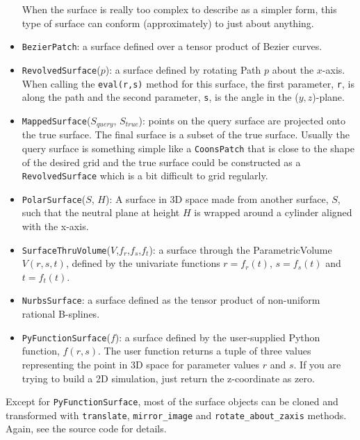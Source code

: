 \documentclass[12pt,a4paper,twoside]{article}
\begin{document}
\begin{itemize}
  When the surface is really too complex to describe as a simpler form,
  this type of surface can conform (approximately) to just about anything.
\item \texttt{BezierPatch}: a surface defined over a tensor product of Bezier curves. 
\item \texttt{RevolvedSurface}($p$): a surface defined by rotating Path $p$
  about the $x$-axis.
  When calling the \texttt{eval(r,s)} method for this surface, 
  the first parameter, \texttt{r}, is along the path and the second parameter, 
  \texttt{s}, is the angle in the ($y,z$)-plane.
\item \texttt{MappedSurface}($S_{query}$, $S_{true}$): points on the
  query surface are projected onto the true surface.
  The final surface is a subset of the true surface.
  Usually the query surface is something simple like a \texttt{CoonsPatch}
  that is close to the shape of the desired grid and
  the true surface could be constructed as a \texttt{RevolvedSurface} which is
  a bit difficult to grid regularly.
\item \texttt{PolarSurface}($S$, $H$): A surface in 3D space made from another surface, $S$,
  such that the neutral plane at height $H$ is wrapped around a cylinder aligned with
  the x-axis.
\item \texttt{SurfaceThruVolume}($V$,$f_r$,$f_s$,$f_t$): a surface through the
  ParametricVolume $V(r,s,t)$, defined by the univariate functions 
  $r=f_r(t)$, $s=f_s(t)$ and $t=f_t(t)$.
\item \texttt{NurbsSurface}: a surface defined as the tensor product of non-uniform rational B-splines.
\item \texttt{PyFunctionSurface}($f$): a surface defined by the user-supplied Python function, $f(r,s)$.
  The user function returns a tuple of three values representing the point in 3D space 
  for parameter values $r$ and $s$.
  If you are trying to build a 2D simulation, just return the z-coordinate as zero.
\end{itemize} 

Except for \texttt{PyFunctionSurface}, most of the surface objects can be cloned and transformed
with \texttt{translate}, \texttt{mirror\_image} and \texttt{rotate\_about\_zaxis} methods.
Again, see the source code for details.
\end{document}
